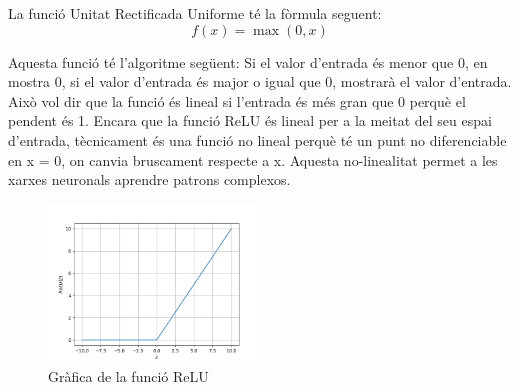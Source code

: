 \begin{enumerate}
La funció Unitat Rectificada Uniforme té la fòrmula seguent:
\[ f(x) = \max(0, x) \]

Aquesta funció té l'algoritme següent: Si el valor d'entrada és menor que 0, en mostra 0, si el valor d'entrada és major o igual que 0, mostrarà el valor d'entrada. Això vol dir que la funció és lineal si l'entrada és més gran que 0 perquè el pendent és 1. Encara que la funció ReLU és lineal per a la meitat del seu espai d'entrada, tècnicament és una funció no lineal perquè té un punt no diferenciable en x = 0, on canvia bruscament respecte a x. Aquesta no-linealitat permet a les xarxes neuronals aprendre patrons complexos.

\begin{figure}[h!]
    \centering
    \includegraphics[width=0.5\textwidth]{./figures/ReLU.png}
    \caption{Gràfica de la funció ReLU}
\end{figure}

\end{enumerate}

